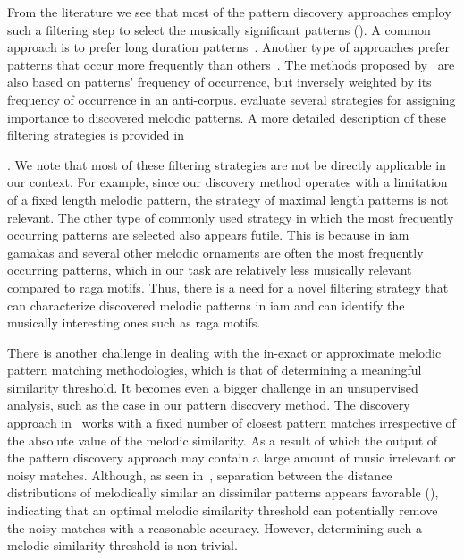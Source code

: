 From the literature we see that most of the pattern discovery approaches employ such a filtering step to select the musically significant patterns (). A common approach is to prefer long duration patterns~\citep{Cambouropoulos2006,Karydis2006}. Another type of approaches prefer patterns that occur more frequently than others~\citep{Cambouropoulos2006,meredith2002algorithms}. The methods proposed by~\cite{conklin2010discovery,Conklin2010a} are also based on patterns' frequency of occurrence, but inversely weighted by its frequency of occurrence in an anti-corpus. \cite{collins2011modeling} evaluate several strategies for assigning importance to discovered melodic patterns. A more detailed description of these filtering strategies is provided in~{. We note that most of these filtering strategies are not be directly applicable in our context. For example, since our discovery method operates with a limitation of a fixed length melodic pattern, the strategy of maximal length patterns is not relevant. The other type of commonly used strategy in which the most frequently occurring patterns are selected also appears futile. This is because in \gls{iam} \glspl{gamaka} and several other melodic ornaments are often the most frequently occurring patterns, which in our task are relatively less musically relevant compared to \gls{raga} motifs. Thus, there is a need for a novel filtering strategy that can characterize discovered melodic patterns in \gls{iam} and can identify the musically interesting ones such as \gls{raga} motifs.	

There is another challenge in dealing with the in-exact or approximate melodic pattern matching methodologies, which is that of determining a meaningful similarity threshold. It becomes even a bigger challenge in an unsupervised analysis, such as the case in our pattern discovery method. The discovery approach in~ works with a fixed number of closest pattern matches irrespective of the absolute value of the melodic similarity. As a result of which the output of the pattern discovery approach may contain a large amount of music irrelevant or noisy matches. Although, as seen in~, separation between the distance distributions of melodically similar an dissimilar patterns appears favorable (), indicating that an optimal melodic similarity threshold can potentially remove the noisy matches with a reasonable accuracy. However, determining such a melodic similarity threshold is non-trivial.

}

